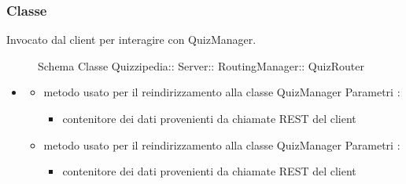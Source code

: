 \subsubsection{Classe }
Invocato dal client per interagire con QuizManager.
\begin{figure}[H]
\centering
\noindent{}
\caption[Schema Classe QuizRouter]{Schema Classe Quizzipedia:: Server:: RoutingManager:: QuizRouter}
\end{figure}
\begin{itemize}
\item {}
\begin{itemize}
\item {}
\newline
metodo usato per il reindirizzamento alla classe QuizManager
\newline
Parametri :
\begin{itemize}
\item {}
\newline
contenitore dei dati provenienti da chiamate REST del client
\end{itemize}
\item {}
\newline
metodo usato per il reindirizzamento alla classe QuizManager
\newline
Parametri :
\begin{itemize}
\item {}
\newline
contenitore dei dati provenienti da chiamate REST del client
\end{itemize}
\end{itemize}
\end{itemize}
